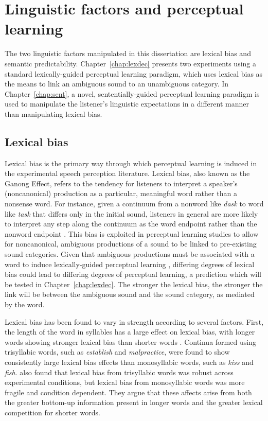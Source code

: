 \section{Linguistic factors and perceptual learning}
\label{sec:linguistic}

The two linguistic factors manipulated in this dissertation are lexical bias and semantic predictability.  
Chapter~\ref{chap:lexdec} presents two experiments using a standard lexically-guided perceptual learning paradigm, which uses lexical bias as the means to link an ambiguous sound to an unambiguous category.
In Chapter~\ref{chap:sent}, a novel, sententially-guided perceptual learning paradigm is used to manipulate the listener's linguistic expectations in a different manner than manipulating lexical bias.

\subsection{Lexical bias}
\label{sec:lexicalbias}

Lexical bias is the primary way through which perceptual learning is induced in the experimental speech perception literature.
Lexical bias, also known as the Ganong Effect, refers to the tendency for listeners to interpret a speaker's (noncanonical) production as a particular, meaningful word rather than a nonsense word.  
For instance, given a continuum from a nonword like \emph{dask} to word like \emph{task} that differs only in the initial sound, listeners in general are more likely to interpret any step along the continuum as the word endpoint rather than the nonword endpoint \citep{Ganong1980}. 
This bias is exploited in perceptual learning studies to allow for noncanonical, ambiguous productions of a sound to be linked to pre-existing sound categories.
Given that ambiguous productions must be associated with a word to induce lexically-guided perceptual learning \citep{Norris2003}, differing degrees of lexical bias could lead to differing degrees of perceptual learning, a prediction which will be tested in Chapter~\ref{chap:lexdec}.  
The stronger the lexical bias, the stronger the link will be between the ambiguous sound and the sound category, as mediated by the word.

Lexical bias has been found to vary in strength according to several factors.  
First, the length of the word in syllables has a large effect on lexical bias, with longer words showing stronger lexical bias than shorter words \citep{Pitt2006}.  
Continua formed using trisyllabic words, such as \emph{establish} and \emph{malpractice}, were found to show consistently large lexical bias effects than monosyllabic words, such as \emph{kiss} and \emph{fish}.  
\citet{Pitt2006} also found that lexical bias from trisyllabic words was robust across experimental conditions, but lexical bias from monosyllabic words was more fragile and condition dependent.  
They argue that these affects arise from both the greater bottom-up information present in longer words and the greater lexical competition for shorter words.

